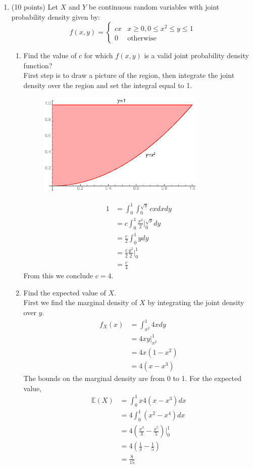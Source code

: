 \documentclass[12pt]{article}
\def\E{{\mathbb E}}
\begin{document}
\begin{enumerate}
\item (10 points) Let $X$ and $Y$ be continuous random variables with joint probability density given by:
\[
f(x,y) = \begin{cases}
cx & x \geq 0, 0 \leq x^2 \leq y \leq 1 \\
0 & \text{otherwise}
\end{cases}
\]
\begin{enumerate}
\item Find the value of $c$ for which $f(x,y)$ is a valid joint probability density function?\\

First step is to draw a picture of the region, then integrate the joint density over the region and set the integral equal to 1.
\begin{figure}[H]
\centering
\includegraphics[width=8cm]{exam2region.eps}
\end{figure}
\begin{align*}
1 &= \int_0^1 \int_0^{\sqrt{y}} cx dx dy\\
&= c \int_0^1 \frac{x^2}{2}\Bigr|_0^{\sqrt{y}} dy\\
&= \frac{c}{2} \int_0^1 y dy\\
&= \frac{c}{2}\frac{y^2}{2}\Bigr|_0^1\\
&= \frac{c}{4}
\end{align*}
From this we conclude $c = 4$.

\item Find the expected value of $X$.\\

First we find the marginal density of $X$ by integrating the joint density over $y$.
\begin{align*}
f_X(x) &= \int_{x^2}^1 4x dy\\
&= 4 x y\Bigr|_{x^2}^1 \\
&= 4 x (1 - x^2)\\
&= 4 (x - x^3) 
\end{align*}
The bounds on the marginal density are from 0 to 1. For the expected value,
\begin{align*}
\E(X) &= \int_0^1 x 4(x - x^3) dx\\
&= 4 \int_0^1 (x^2 - x^4) dx\\
&= 4 \left( \frac{x^3}{3} - \frac{x^5}{5} \right)\Bigr|_0^1\\
&= 4 \left( \frac{1}{3} - \frac{1}{5} \right)\\
&= \frac{8}{15}
\end{align*}


\end{enumerate}
\end{enumerate}
\end{document}

